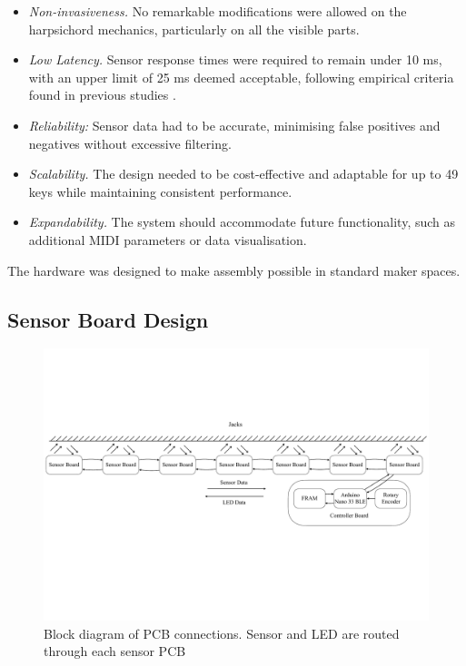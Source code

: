 \begin{itemize}
    \item \emph{Non-invasiveness.} No remarkable modifications were allowed on the harpsichord mechanics, particularly on all the visible parts.
    \item \emph{Low Latency.} Sensor response times were required to remain under 10 ms, with an upper limit of 25 ms deemed acceptable, following empirical criteria found in previous studies \cite{Jack2016}.
    \item \emph{Reliability:} Sensor data had to be accurate, minimising false positives and negatives without excessive filtering.
    \item \emph{Scalability.} The design needed to be cost-effective and adaptable for up to 49 keys while maintaining consistent performance.
    \item \emph{Expandability.} The system should accommodate future functionality, such as additional MIDI parameters or data visualisation.
\end{itemize}

The hardware was designed to make assembly possible in standard maker spaces.  

\subsection{Sensor Board Design}\label{sensor-board}

\begin{figure}
    \centering
    \includegraphics[width=\linewidth]{src/images/block-diagram.pdf}
    \caption{Block diagram of PCB connections. Sensor and LED are routed through each sensor PCB}
    \label{fig:system-block-diagram}
\end{figure}

